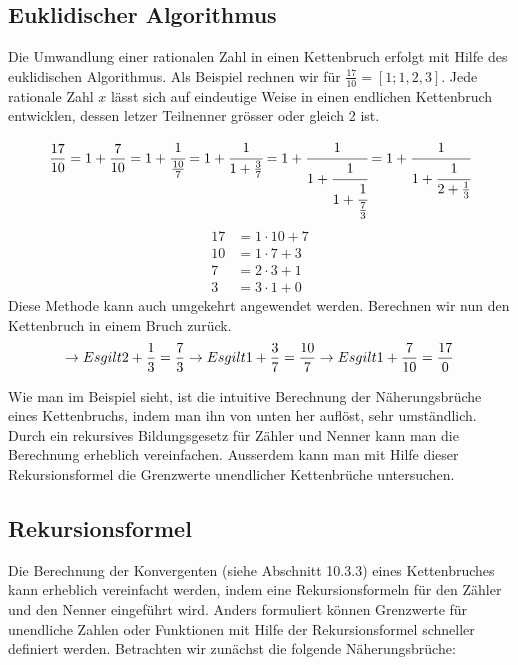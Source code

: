 \subsection{Euklidischer Algorithmus}
Die Umwandlung einer rationalen Zahl in einen Kettenbruch erfolgt
mit Hilfe des euklidischen Algorithmus.
Als Beispiel rechnen wir für $\frac{17}{10} = [1;1,2,3]$.
Jede rationale Zahl $x$ lässt sich auf eindeutige Weise in einen
endlichen Kettenbruch entwicklen, dessen letzer Teilnenner grösser
oder gleich 2 ist.
\begin{beispiel}
\begin{equation}
\frac{17}{10}
=
1 + \frac{7}{10}
=
1 + \cfrac{1}{\frac{10}{7}}
=
1 + \cfrac{1}{1+\frac{3}{7}}
=
1 + \cfrac{1}{1+\cfrac{1}{1+\cfrac{1}{\frac{7}{3}}}}
=
1 + \cfrac{1}{1+\cfrac{1}{2+\frac{1}{3}}}
\end{equation}
\begin{align*}
17 &= 1\cdot 10 + 7 \\
10 &= 1\cdot 7 + 3 \\
7 &= 2\cdot 3 + 1 \\
3 &= 3\cdot 1 + 0
\end{align*}
Diese Methode kann auch umgekehrt angewendet werden.
Berechnen wir nun den Kettenbruch in einem Bruch zurück.
\begin{equation}
[1;1,2,3] 	
\rightarrow Es gilt		2 + \frac{1}{3} = \frac{7}{3} \\
\rightarrow Es gilt		1 + \frac{3}{7} = \frac{10}{7} \\
\rightarrow Es gilt		1 + \frac{7}{10} = \frac{17}{0} \\
\end{equation}
\end{beispiel}
Wie man im Beispiel sieht, ist die intuitive Berechnung der
Näherungsbrüche eines Kettenbruchs, indem man ihn von unten her
auflöst, sehr umständlich. Durch ein rekursives Bildungsgesetz für
Zähler und Nenner kann man die Berechnung erheblich vereinfachen.
Ausserdem kann man mit Hilfe dieser Rekursionsformel die Grenzwerte
unendlicher Kettenbrüche untersuchen.

\subsection{Rekursionsformel}
Die Berechnung der Konvergenten (siehe Abschnitt 10.3.3) eines Kettenbruches 
kann erheblich vereinfacht werden, indem eine Rekursionsformeln für den Zähler 
und den Nenner eingeführt wird. Anders formuliert können Grenzwerte für unendliche 
Zahlen oder Funktionen mit Hilfe der Rekursionsformel schneller definiert werden.
Betrachten wir zunächst die folgende Näherungsbrüche:

